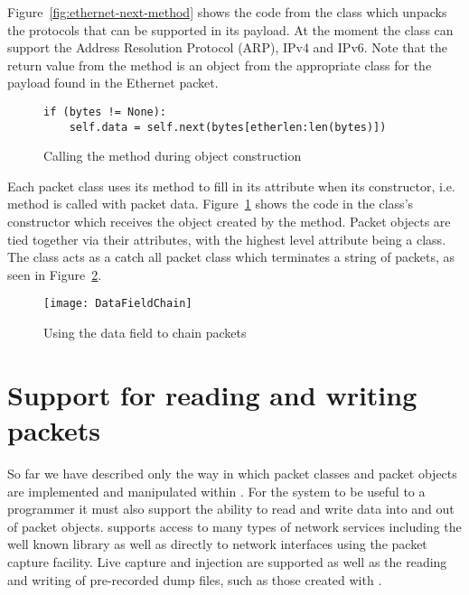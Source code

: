 \documentclass{sig-alternate-10pt}
\begin{document}
Figure~\ref{fig:ethernet-next-method} shows the code from the
 class which unpacks the protocols that can be
supported in its payload.  At the moment the  class
can support the Address Resolution Protocol (ARP), IPv4 and IPv6.
Note that the return value from the  method is an object
from the appropriate class for the payload found in the Ethernet packet.

\begin{figure}
  \centering
\begin{verbatim}
if (bytes != None):
    self.data = self.next(bytes[etherlen:len(bytes)])
\end{verbatim}
  \caption{Calling the  method during object construction}
  \label{fig:calling-next-method}
\end{figure}

Each packet class uses its  method to fill in its
 attribute when its constructor,
i.e.  method is called with packet data.
Figure~\ref{fig:calling-next-method} shows the code in the
 class's constructor which receives the object created
by the  method.  Packet objects are tied together via
their  attributes, with the highest level attribute being
a  class.  The  class acts as a catch
all packet class which terminates a string of packets, as seen in
Figure~\ref{fig:data-field-chain}.

\begin{figure}
  \centering
\label{fig:data-field-chain}
\texttt{[image: DataFieldChain]}
  \caption{Using the data field to chain packets}
\end{figure}

\section{Support for reading and writing packets}
\label{sec:support-for-reading-and-writing}

So far we have described only the way in which packet classes and
packet objects are implemented and manipulated within .
For the system to be useful to a programmer it must also support the
ability to read and write data into and out of packet objects.
 supports access to many types of network services
including the well known  library as well as directly
to network interfaces using the  packet capture
facility.  Live capture and injection are supported as well as the
reading and writing of pre-recorded dump files, such as those created
with \cite{}.
\end{document}
